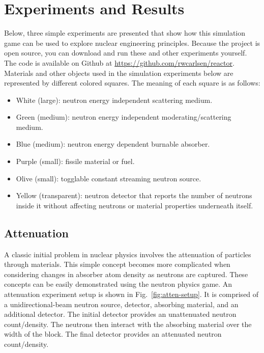\documentclass{anstrans}
\newcommand{\Fig}{Fig.~}
\begin{document}
\section{Experiments and Results}

Below, three simple experiments are presented that show how this simulation
game can be used to explore nuclear engineering principles.  Because the
project is open source, you can download and run these and other
experiments yourself.  The code is available on Github at
\url{https://github.com/rwcarlsen/reactor}.  Materials and other objects used
in the simulation experiments below are represented by different colored
squares.  The meaning of each square is as follows:

\begin{itemize}
        
    \item White (large): neutron energy independent scattering medium.

    \item Green (medium): neutron energy independent moderating/scattering
        medium.

    \item Blue (medium): neutron energy dependent burnable absorber.

    \item Purple (small): fissile material or fuel.

    \item Olive (small): togglable constant streaming neutron source.

    \item Yellow (transparent): neutron detector that reports the number of
        neutrons inside it without affecting neutrons or material properties
        underneath itself.

\end{itemize}


\subsection{Attenuation}

A classic initial problem in nuclear physics involves the attenuation of
particles through materials. This simple concept becomes more complicated when
considering changes in absorber atom density as neutrons are captured. These
concepts can be easily demonstrated using the neutron physics game.  An
attenuation experiment setup is shown in \Fig \ref{fig:atten-setup}. It is
comprised of a unidirectional-beam neutron source, detector, absorbing
material, and an additional detector. The initial detector provides an
unattenuated neutron count/density. The neutrons then interact with the
absorbing material over the width of the block. The final detector provides an
attenuated neutron count/density.
\end{document}
